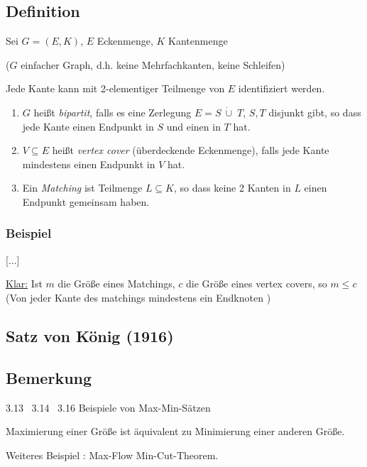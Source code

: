 \subsection{Definition} %

Sei $G = (E,K)$, $E$ Eckenmenge, $K$ Kantenmenge

($G$ einfacher Graph, d.h. keine Mehrfachkanten, keine Schleifen)

Jede Kante kann mit 2-elementiger Teilmenge von $E$ identifiziert werden.

\begin{enumerate}
	\item $G$ heißt \emph{bipartit}, falls es eine Zerlegung $E=S\: \dot{\cup}\; T$, $S, T$ disjunkt gibt, so dass jede Kante einen Endpunkt in $S$ und einen in $T$ hat.
	
	\item
	$V \subseteq E$ heißt \emph{vertex cover} (überdeckende Eckenmenge), falls jede Kante mindestens einen Endpunkt in $V$ hat.
	
	\item
	Ein \emph{Matching} ist Teilmenge $L \subseteq K$, so dass keine 2 Kanten in $L$ einen Endpunkt gemeinsam haben.
	
\end{enumerate}

\subsubsection*{Beispiel}

[...]

\underline{Klar:} Ist $m$ die Größe eines Matchings, $c$ die Größe eines vertex covers, so $m \leq c$
\\(Von jeder Kante des matchings mindestens ein Endknoten )

\subsection{Satz von König (1916)} %


\subsection{Bemerkung}

3.13 \ 3.14 \ 3.16 Beispiele von Max-Min-Sätzen %

Maximierung einer Größe ist äquivalent zu Minimierung einer anderen Größe.

Weiteres Beispiel : Max-Flow Min-Cut-Theorem.

